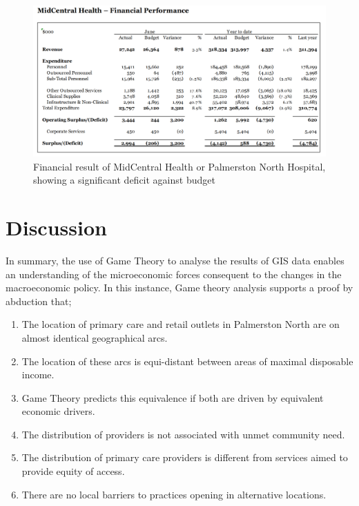 \documentclass[11pt,a4paper]{article}
\begin{document}
\begin{figure}[htp]
\centering
\includegraphics[scale=0.30]{MCHbalance.png}
\caption{Financial result of MidCentral Health or Palmerston North Hospital, showing a significant deficit against budget }
\label{Financial result for MidCentral Health - Palmerston North Hospital}
\end{figure}


\pagebreak


\section{Discussion}
In summary, the use of Game Theory to analyse the results of GIS data enables an understanding of the microeconomic forces consequent to the changes in the macroeconomic policy. In this instance, Game theory analysis supports a proof by abduction that;


\begin{enumerate}
\item The location of primary care and retail outlets in Palmerston North are on almost identical geographical arcs.
\item The location of these arcs is equi-distant between areas of maximal disposable income.
\item Game Theory predicts this equivalence if both are driven by equivalent economic drivers.
\item The distribution of providers is not associated with unmet community need.
\item The distribution of primary care providers is different from services aimed to provide equity of access.
\item There are no local barriers to practices opening in alternative locations.
\end{enumerate}
\end{document}

